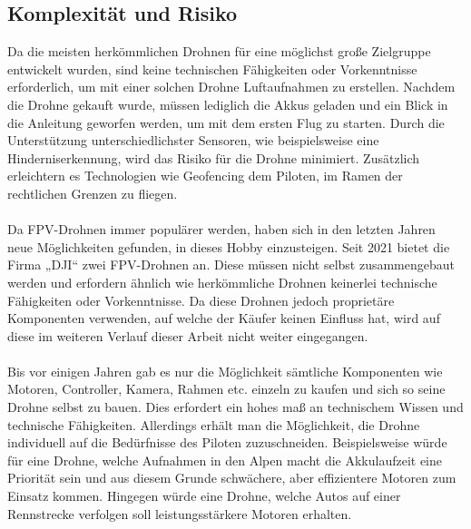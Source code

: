 \subsection[Komplexität und Risiko]{Komplexität und Risiko}
Da die meisten herkömmlichen Drohnen für eine möglichst große Zielgruppe entwickelt wurden, sind keine technischen Fähigkeiten oder Vorkenntnisse erforderlich, um mit einer solchen Drohne Luftaufnahmen zu erstellen. Nachdem die Drohne gekauft wurde, müssen lediglich die Akkus geladen und ein Blick in die Anleitung geworfen werden, um mit dem ersten Flug zu starten. Durch die Unterstützung unterschiedlichster Sensoren, wie beispielsweise eine Hinderniserkennung, wird das Risiko für die Drohne minimiert. Zusätzlich erleichtern es Technologien wie Geofencing dem Piloten, im Ramen der rechtlichen Grenzen zu fliegen.
\\ \\
Da FPV-Drohnen immer populärer werden, haben sich in den letzten Jahren neue Möglichkeiten gefunden, in dieses Hobby einzusteigen. Seit 2021 bietet die Firma „DJI“ zwei FPV-Drohnen an. Diese müssen nicht selbst zusammengebaut werden und erfordern ähnlich wie herkömmliche Drohnen keinerlei technische Fähigkeiten oder Vorkenntnisse. Da diese Drohnen jedoch proprietäre Komponenten verwenden, auf welche der Käufer keinen Einfluss hat, wird auf diese im weiteren Verlauf dieser Arbeit nicht weiter eingegangen.
\\ \\
Bis vor einigen Jahren gab es nur die Möglichkeit sämtliche Komponenten wie Motoren, Controller, Kamera, Rahmen etc. einzeln zu kaufen und sich so seine Drohne selbst zu bauen. Dies erfordert ein hohes maß an technischem Wissen und technische Fähigkeiten. Allerdings erhält man die Möglichkeit, die Drohne individuell auf die Bedürfnisse des Piloten zuzuschneiden. Beispielsweise würde für eine Drohne, welche Aufnahmen in den Alpen macht die Akkulaufzeit eine Priorität sein und aus diesem Grunde schwächere, aber effizientere Motoren zum Einsatz kommen. Hingegen würde eine Drohne, welche Autos auf einer Rennstrecke verfolgen soll leistungsstärkere Motoren erhalten.


